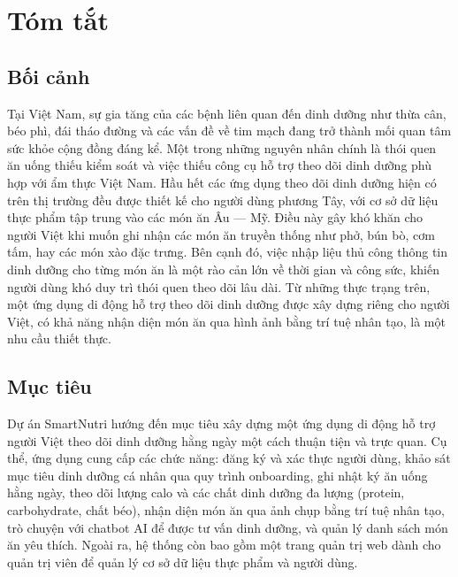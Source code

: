
\chapter*{Tóm tắt}

\vspace{0.5cm}

\section*{Bối cảnh}

Tại Việt Nam, sự gia tăng của các bệnh liên quan đến dinh dưỡng như thừa cân, béo phì, đái tháo đường và các vấn đề về tim mạch đang trở thành mối quan tâm sức khỏe cộng đồng đáng kể. Một trong những nguyên nhân chính là thói quen ăn uống thiếu kiểm soát và việc thiếu công cụ hỗ trợ theo dõi dinh dưỡng phù hợp với ẩm thực Việt Nam. Hầu hết các ứng dụng theo dõi dinh dưỡng hiện có trên thị trường đều được thiết kế cho người dùng phương Tây, với cơ sở dữ liệu thực phẩm tập trung vào các món ăn Âu — Mỹ. Điều này gây khó khăn cho người Việt khi muốn ghi nhận các món ăn truyền thống như phở, bún bò, cơm tấm, hay các món xào đặc trưng. Bên cạnh đó, việc nhập liệu thủ công thông tin dinh dưỡng cho từng món ăn là một rào cản lớn về thời gian và công sức, khiến người dùng khó duy trì thói quen theo dõi lâu dài. Từ những thực trạng trên, một ứng dụng di động hỗ trợ theo dõi dinh dưỡng được xây dựng riêng cho người Việt, có khả năng nhận diện món ăn qua hình ảnh bằng trí tuệ nhân tạo, là một nhu cầu thiết thực.

\section*{Mục tiêu}

Dự án SmartNutri hướng đến mục tiêu xây dựng một ứng dụng di động hỗ trợ người Việt theo dõi dinh dưỡng hằng ngày một cách thuận tiện và trực quan. Cụ thể, ứng dụng cung cấp các chức năng: đăng ký và xác thực người dùng, khảo sát mục tiêu dinh dưỡng cá nhân qua quy trình onboarding, ghi nhật ký ăn uống hằng ngày, theo dõi lượng calo và các chất dinh dưỡng đa lượng (protein, carbohydrate, chất béo), nhận diện món ăn qua ảnh chụp bằng trí tuệ nhân tạo, trò chuyện với chatbot AI để được tư vấn dinh dưỡng, và quản lý danh sách món ăn yêu thích. Ngoài ra, hệ thống còn bao gồm một trang quản trị web dành cho quản trị viên để quản lý cơ sở dữ liệu thực phẩm và người dùng.

